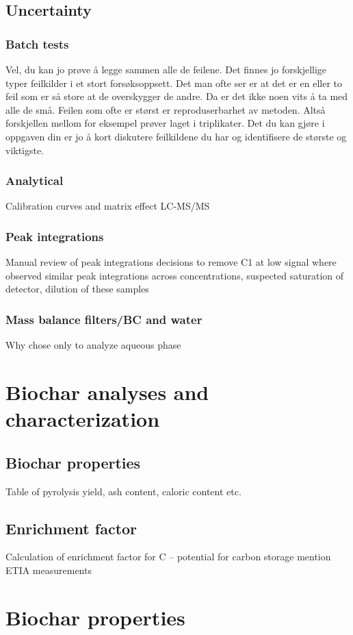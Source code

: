 \subsection{Uncertainty}
\subsubsection{Batch tests}
Vel, du kan jo prøve å legge sammen alle de feilene. Det finnes jo forskjellige typer feilkilder i et stort forsøksoppsett. Det man ofte ser er at det er en eller to feil som er så store at de overskygger de andre. Da er det ikke noen vits å ta med alle de små. Feilen som ofte er størst er reproduserbarhet av metoden. Altså forskjellen mellom for eksempel prøver laget i triplikater. Det du kan gjøre i oppgaven din er jo å kort diskutere feilkildene du har og identifisere de største og viktigste.

\subsubsection{Analytical}
Calibration curves and matrix effect
LC-MS/MS

\subsubsection{Peak integrations}
Manual review of peak integrations
decisions to remove C1 at low signal
where observed similar peak integrations across concentrations, suspected saturation of detector, dilution of these samples

\subsubsection{Mass balance filters/BC and water}
Why chose only to analyze aqueous phase


\section{Biochar analyses and characterization}

\subsection{Biochar properties}
Table of pyrolysis yield, ash content, caloric content etc. 

\subsection{Enrichment factor}
Calculation of enrichment factor for C – potential for carbon storage
mention ETIA measurements

\section{Biochar properties}

